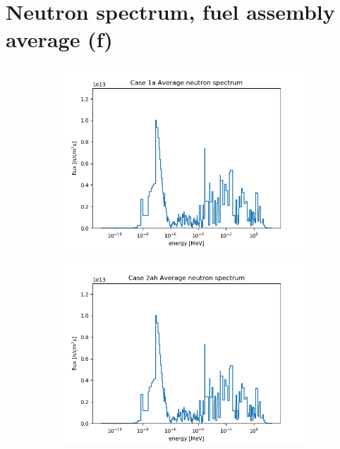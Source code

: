 \documentclass[letterpaper,11pt]{report}
\begin{document}
\section{Neutron spectrum, fuel assembly average (f)}
        \begin{figure}[H]
            \centering
            \begin{subfigure}{.33\textwidth}
                \centering
                \includegraphics[width=\linewidth]{../../phase1a/case1a/analysis_output/p1a_1a_f.png}
                \caption{}
              \end{subfigure}%
              \begin{subfigure}{.33\textwidth}
                \centering
                \includegraphics[width=\linewidth]{../../phase1a/case2ah/analysis_output/p1a_2ah_f.png}

\end{subfigure}
\end{figure}
\end{document}
